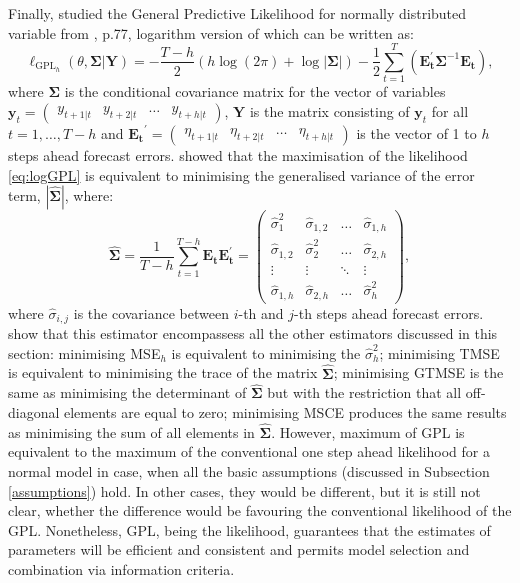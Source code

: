 \documentclass[
]{book}
\theoremstyle{definition}
\theoremstyle{definition}
\theoremstyle{definition}
\theoremstyle{definition}
\theoremstyle{remark}
\begin{document}
Finally, \citet{Svetunkov2020Multistep} studied the General Predictive Likelihood for normally distributed variable from \citet{Clements1998}, p.77, logarithm version of which can be written as:
\begin{equation}
    \ell_{\mathrm{GPL}_h}(\theta, \boldsymbol{\Sigma} | \mathbf{Y}) = -\frac{T-h}{2} \left( h \log(2 \pi) + \log | \mathbf{\Sigma}| \right) -\frac{1}{2} \sum_{t=1}^T \left( \mathbf{E_t^\prime} \mathbf{\Sigma}^{-1} \mathbf{E_t} \right) ,
  \label{eq:logGPL}
\end{equation}
where \(\boldsymbol{\Sigma}\) is the conditional covariance matrix for the vector of variables \(\mathbf{y}_t=\begin{pmatrix} y_{t+1|t} & y_{t+2|t} & \ldots & y_{t+h|t} \end{pmatrix}\), \(\mathbf{Y}\) is the matrix consisting of \(\mathbf{y}_t\) for all \(t=1, \ldots, T-h\) and \(\mathbf{E_t}^{\prime} = \begin{pmatrix} \eta_{t+1|t} & \eta_{t+2|t} & \ldots & \eta_{t+h|t} \end{pmatrix}\) is the vector of 1 to \(h\) steps ahead forecast errors. \citet{Svetunkov2020Multistep} showed that the maximisation of the likelihood \eqref{eq:logGPL} is equivalent to minimising the generalised variance of the error term, \(|\hat{\boldsymbol{\Sigma}}|\), where:
\begin{equation}
    \hat{\boldsymbol{\Sigma}} = \frac{1}{T-h} \sum_{t=1}^{T-h} \mathbf{E_t} \mathbf{E_t^\prime} =
    \begin{pmatrix}
        \hat{\sigma}_1^2 & \hat{\sigma}_{1,2} & \dots & \hat{\sigma}_{1,h} \\
        \hat{\sigma}_{1,2} & \hat{\sigma}_2^2 & \dots & \hat{\sigma}_{2,h} \\
        \vdots & \vdots & \ddots & \vdots \\
        \hat{\sigma}_{1,h} & \hat{\sigma}_{2,h} & \dots & \hat{\sigma}_h^2
    \end{pmatrix} ,
    \label{eq:Sigmaest}
\end{equation}
where \(\hat{\sigma}_{i,j}\) is the covariance between \(i\)-th and \(j\)-th steps ahead forecast errors. \citet{Svetunkov2020Multistep} show that this estimator encompassess all the other estimators discussed in this section: minimising MSE\(_h\) is equivalent to minimising the \(\hat{\sigma}^2_{h}\); minimising TMSE is equivalent to minimising the trace of the matrix \(\hat{\boldsymbol{\Sigma}}\); minimising GTMSE is the same as minimising the determinant of \(\hat{\boldsymbol{\Sigma}}\) but with the restriction that all off-diagonal elements are equal to zero; minimising MSCE produces the same results as minimising the sum of all elements in \(\hat{\boldsymbol{\Sigma}}\). However, maximum of GPL is equivalent to the maximum of the conventional one step ahead likelihood for a normal model in case, when all the basic assumptions (discussed in Subsection \ref{assumptions}) hold. In other cases, they would be different, but it is still not clear, whether the difference would be favouring the conventional likelihood of the GPL. Nonetheless, GPL, being the likelihood, guarantees that the estimates of parameters will be efficient and consistent and permits model selection and combination via information criteria.
\end{document}
